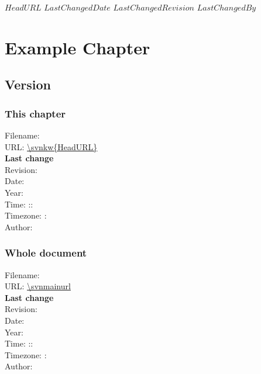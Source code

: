 \svnidlong
{$HeadURL$}
{$LastChangedDate$}
{$LastChangedRevision$}
{$LastChangedBy$}

\chapter{Example Chapter}

\section{Version}
\subsection*{This chapter}
Filename: \\
URL: \url{\svnkw{HeadURL}}\\
\textbf{Last change}\\
Revision: \svnfilerev\\
Date: \svnfiledate\\
Year: \svnfileyear\\
Time: \svnfilehour:\svnfileminute:\svnfilesecond\ \\
Timezone: \svnfiletimezonehour : \svnfiletimezoneminute\\
Author: \svnfileauthor\\

\subsection*{Whole document}
Filename: \svnnolinkurl{\svnmainfilename}\\
URL: \url{\svnmainurl}\\
\textbf{Last change}\\
Revision: \svnrev\\
Date: \svndate\\
Year: \svnyear\\
Time: \svnhour:\svnminute:\svnsecond\ \\
Timezone: \svntimezonehour : \svntimezoneminute\\
Author: \svnauthor\\

